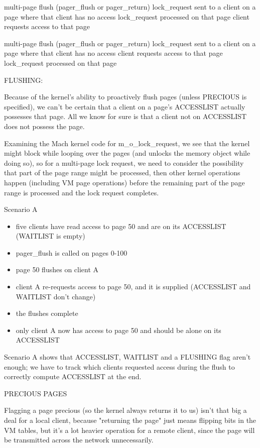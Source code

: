 \documentclass{article}
\begin{document}
multi-page flush (pager_flush or pager_return)
lock_request sent to a client on a page where that client has no access
lock_request processed on that page
client requests access to that page

multi-page flush (pager_flush or pager_return)
lock_request sent to a client on a page where that client has no access
client requests access to that page
lock_request processed on that page



FLUSHING:

Because of the kernel's ability to proactively flush pages (unless PRECIOUS is specified),
we can't be certain that a client on a page's ACCESSLIST actually possesses that page.
All we know for sure is that a client not on ACCESSLIST does not possess the page.

Examining the Mach kernel code for m_o_lock_request, we see that the kernel might block
while looping over the pages (and unlocks the memory object while doing so), so for a
multi-page lock request, we need to consider the possibility that part of the page range
might be processed, then other kernel operations happen (including VM page operations)
before the remaining part of the page range is processed and the lock request completes.

Scenario A
\begin{itemize}
\item five clients have read access to page 50 and are on its ACCESSLIST (WAITLIST is empty)
\item pager_flush is called on pages 0-100
\item page 50 flushes on client A
\item client A re-requests access to page 50, and it is supplied (ACCESSLIST and WAITLIST don't change)
\item the flushes complete
\item only client A now has access to page 50 and should be alone on its ACCESSLIST
\end{itemize}

Scenario A shows that ACCESSLIST, WAITLIST and a FLUSHING flag aren't enough; we have to track
which clients requested access during the flush to correctly compute ACCESSLIST at the end.


PRECIOUS PAGES

Flagging a page precious (so the kernel always returns it to us) isn't that big a deal
for a local client, because "returning the page" just means flipping bits in the VM tables,
but it's a lot heavier operation for a remote client, since the page will be transmitted
across the network unnecessarily.
\end{document}
